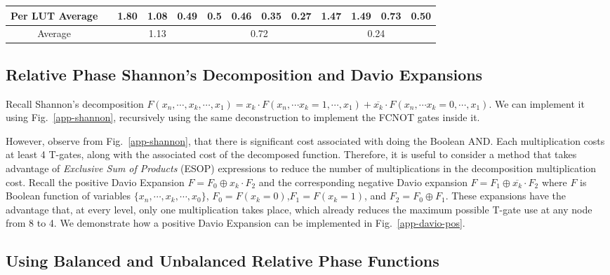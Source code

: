 \documentclass[a4paper]{article}
\begin{document}
{\begin{table}[t]
\begin{center}
{\begin{tabular}{c|c|c|c|c|c|c|c|c|c|c|c|c}
        \hline
        Per LUT Average       &                & 1.80 & 1.08 & 0.49        & 0.5 & 0.46 & 0.35 & 0.27              & 1.47 & 1.49 & 0.73 & 0.50              \\ \hline
        Average               &                &\multicolumn{3}{c}{1.13}   & \multicolumn{4}{|c}{0.72}             & \multicolumn{4}{|c}{0.24}              \\ \hline
      \end{tabular}
   }
  \end{center}
\vspace*{-8mm}
\end{table}

\subsection{Relative Phase Shannon's Decomposition and Davio Expansions}
\label{Subsec:shannon}

Recall Shannon's decomposition $F(x_n,\cdots,x_k,\cdots,x_1) = x_k \cdot F(x_n,\cdots x_k=1,\cdots,x_1) + \overline{x_k} \cdot F(x_n,\cdots x_k=0,\cdots,x_1)$. We can implement it using Fig.~\ref{app-shannon}, recursively using the same deconstruction to implement the FCNOT gates inside it.

However, observe from Fig.~\ref{app-shannon}, that there is significant cost associated with doing the Boolean AND. Each multiplication costs at least 4 T-gates, along with the associated cost of the decomposed function.
Therefore, it is useful to consider a method that takes advantage of
{\it Exclusive Sum of Products} (ESOP) expressions to reduce the number of multiplications in the decomposition multiplication cost. Recall the positive Davio Expansion $F=F_0\oplus x_k \cdot F_2$ and the corresponding
negative Davio expansion $F=F_1 \oplus \overline{x_k} \cdot F_2$ where $F$ is Boolean function of variables $\{x_n,\cdots,x_k,\cdots,x_0\}$,
$F_0 = F(x_k=0)$,$F_1 = F(x_k=1)$,
and $F_2 = F_0 \oplus F_1$. These expansions have the advantage that, at every level, only one
multiplication takes place, which already reduces the maximum possible T-gate use at any node from
8 to 4. We demonstrate how a positive Davio Expansion can be implemented in Fig.~\ref{app-davio-pos}.

\subsection{Using Balanced and Unbalanced Relative Phase Functions}
\label{Subsec:balanced}

}
\end{document}
